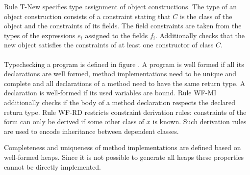 Rule T-New specifies type assignment of object constructions.
The type  of an object construction 
consists of a constraint stating that $C$ is the class of the object and the constraints of its fields.
The field constraints are taken from the types of the expressions $e_i$
assigned to the fields $f_i$.
Additionally  checks
that the new object satisfies the constraints of at least
one constructor  of class $C$.
\\
\\
Typechecking a program is defined in figure .
A program is well formed if all its declarations are well formed,
method implementations need to be unique and complete
and all declarations of a method need to have the same return type.
A declaration is well-formed if its used variables are bound.
Rule WF-MI additionally checks if the body of a method declaration
respects the declared return type.
Rule WF-RD restricts constraint derivation rules:
constraints of the form  can only be derived
if some other class of $x$ is known.
Such derivation rules are used to encode inheritance between
dependent classes.

Completeness and uniqueness of method implementations are defined
based on well-formed heaps.
Since it is not possible to generate all heaps
these properties cannot be directly implemented.

